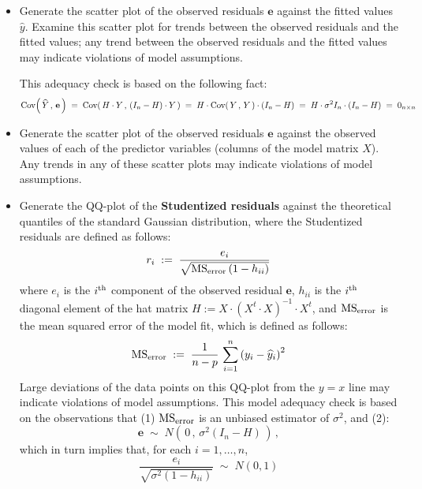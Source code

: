 \documentclass{article}
\begin{document}
\begin{itemize}
\item 	Generate the scatter plot of the observed residuals $\mathbf{e}$ against the fitted values
		$\widehat{y}$.
		Examine this scatter plot for trends between the observed residuals and the fitted values;
		any trend between the observed residuals and the fitted values may indicate violations
		of model assumptions.

		This adequacy check is based on the following fact:
		\begin{equation*}
		\textnormal{Cov}\!\left(\,\widehat{Y}\,,\,\mathbf{e}\,\right)
		\; = \; \textnormal{Cov}\!\left(\,H\cdot Y\,,\,\left(I_{n}-H\right)\cdot Y\,\right)
		\; = \; H\cdot\textnormal{Cov}\!\left(\,Y\,,\,Y\,\right)\cdot \left(I_{n}-H\right)
		\; = \; H\cdot \sigma^{2} I_{n} \cdot \left(I_{n}-H\right)
		\; = \; 0_{n \times n}
		\end{equation*}

\item 	Generate the scatter plot of the observed residuals $\mathbf{e}$ against the observed values of
		each of the predictor variables (columns of the model matrix $X$). Any trends in any of these
		scatter plots may indicate violations of model assumptions.

\item 	Generate the QQ-plot of the \textbf{Studentized residuals} against the theoretical quantiles
		of the standard Gaussian distribution, where the Studentized residuals are defined as follows:
		\begin{equation*}
		r_{i} \; := \; \dfrac{e_{i}}{\sqrt{\textnormal{MS}_{\textnormal{error}}\left(1 - h_{ii}\right)}}
		\end{equation*}
		where $e_{i}$ is the $i^{\textnormal{th}}$ component of the observed residual $\mathbf{e}$,
		$h_{ii}$ is the $i^{\textnormal{th}}$ diagonal element of the hat matrix
		$H := X \cdot \left(X^{t}\cdot X\right)^{-1}\cdot X^{t}$, and
		$\textnormal{MS}_{\textnormal{error}}$ is the mean squared error of the model fit, which is
		defined as follows:
		\begin{equation*}
		\textnormal{MS}_{\textnormal{error}}
		\; := \;
		\dfrac{1}{n - p}\,\sum_{i=1}^{n}\left(y_{i} - \widehat{y}_{i}\right)^{2}
		\end{equation*}
		Large deviations of the data points on this QQ-plot from the $y = x$ line may indicate
		violations of model assumptions.
		This model adequacy check is based on the observations that (1)
		$\textnormal{MS}_{\textnormal{error}}$ is an unbiased estimator of $\sigma^{2}$, and (2):
		\begin{equation*}
		\mathbf{e} \; \sim \; N\!\left(\,0\,,\,\sigma^{2}\left(I_{n}-H\right)\,\right)\,,
		\end{equation*}
		which in turn implies that, for each $i = 1, \ldots, n$,
		\begin{equation*}
		\dfrac{e_{i}}{\sqrt{\sigma^{2}\left(1 - h_{ii}\right)}}
		\; \sim \;
		N(0,1)
		\end{equation*}
\end{itemize}
\end{document}
